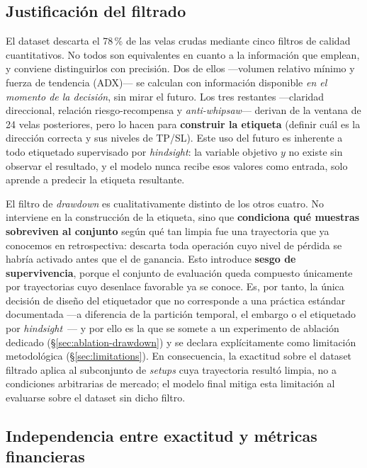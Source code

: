 \documentclass[10pt,twocolumn]{article}
\begin{document}
\subsection{Justificaci\'on del filtrado}

El dataset descarta el 78\,\% de las velas crudas mediante cinco filtros de calidad cuantitativos. No todos son equivalentes en cuanto a la informaci\'on que emplean, y conviene distinguirlos con precisi\'on. Dos de ellos ---volumen relativo m\'inimo y fuerza de tendencia (ADX)--- se calculan con informaci\'on disponible \textit{en el momento de la decisi\'on}, sin mirar el futuro. Los tres restantes ---claridad direccional, relaci\'on riesgo-recompensa y \textit{anti-whipsaw}--- derivan de la ventana de 24 velas posteriores, pero lo hacen para \textbf{construir la etiqueta} (definir cu\'al es la direcci\'on correcta y sus niveles de TP/SL). Este uso del futuro es inherente a todo etiquetado supervisado por \textit{hindsight}: la variable objetivo $y$ no existe sin observar el resultado, y el modelo nunca recibe esos valores como entrada, solo aprende a predecir la etiqueta resultante.

El filtro de \textit{drawdown} es cualitativamente distinto de los otros cuatro. No interviene en la construcci\'on de la etiqueta, sino que \textbf{condiciona qu\'e muestras sobreviven al conjunto} seg\'un qu\'e tan limpia fue una trayectoria que ya conocemos en retrospectiva: descarta toda operaci\'on cuyo nivel de p\'erdida se habr\'ia activado antes que el de ganancia. Esto introduce \textbf{sesgo de supervivencia}, porque el conjunto de evaluaci\'on queda compuesto \'unicamente por trayectorias cuyo desenlace favorable ya se conoce. Es, por tanto, la \'unica decisi\'on de dise\~no del etiquetador que no corresponde a una pr\'actica est\'andar documentada ---a diferencia de la partici\'on temporal, el embargo o el etiquetado por \textit{hindsight}~\cite{pardo2008,nguyen2026}--- y por ello es la que se somete a un experimento de ablaci\'on dedicado (\S\ref{sec:ablation-drawdown}) y se declara expl\'icitamente como limitaci\'on metodol\'ogica (\S\ref{sec:limitations}). En consecuencia, la exactitud sobre el dataset filtrado aplica al subconjunto de \textit{setups} cuya trayectoria result\'o limpia, no a condiciones arbitrarias de mercado; el modelo final mitiga esta limitaci\'on al evaluarse sobre el dataset sin dicho filtro.

\subsection{Independencia entre exactitud y m\'etricas financieras}
\end{document}
